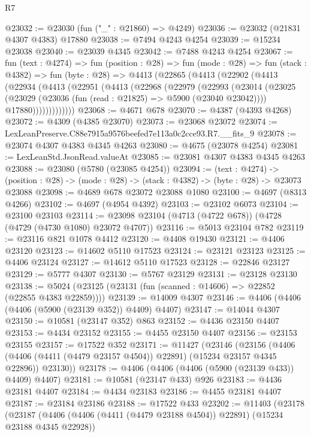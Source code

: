\begin{lexlean}{R7}
\begin{coremodule}
@23032 := @23030 (fun ("_" : @21860) => @4249)
@23036 := @23032 (@21831 @4307 @4383) @17880
@23038 := @7494 @4243 @4254
@23039 := @15234 @23038
@23040 := @23039 @4345
@23042 := @7488 @4243 @4254
@23067 := fun (text : @4274) =>
  fun (position : @28) =>
  fun (mode : @28) =>
  fun (stack : @4382) =>
  fun (byte : @28) =>
  @4413
    (@22865
      (@4413
        (@22902
          (@4413
            (@22934
              (@4413
                (@22951
                  (@4413
                    (@22968
                      (@22979
                        (@22993
                          (@23014
                            (@23025
                              (@23029 (@23036 (fun (read : @21825) => @5900 (@23040 @23042))))
                              @17880)))))))))))))
@23068 := @4671 @678
@23070 := @4387 (@4393 @4268)
@23072 := @4309 (@4385 @23070)
@23073 := @23068 @23072
@23074 := LexLeanPreserve.C88e7915a9576beefed7e113a0c2cce93.R7.__fits_9
@23078 := @23074 @4307 @4383 @4345 @4263
@23080 := @4675 (@23078 @4254)
@23081 := LexLeanStd.JsonRead.valueAt
@23085 := @23081 @4307 @4383 @4345 @4263
@23088 := @23080 (@5780 (@23085 @4254))
@23094 := (text : @4274) ->
  (position : @28) -> (mode : @28) -> (stack : @4382) -> (byte : @28) -> @23073 @23088
@23098 := @4689 @678 @23072 @23088 @1080
@23100 := @4697 (@8313 @4266)
@23102 := @4697 (@4954 @4392)
@23103 := @23102 @6073
@23104 := @23100 @23103
@23114 := @23098 @23104 (@4713 (@4722 @678)) (@4728 (@4729 (@4730 @1080) @23072 @4707))
@23116 := @5013 @23104 @782
@23119 := @23116 @821 @1078 @4412
@23120 := @4408 @19430
@23121 := @4406 @23120
@23123 := @14602 @5110 @17523
@23124 := @23121 @23123
@23125 := @4406 @23124
@23127 := @14612 @5110 @17523
@23128 := @22846 @23127
@23129 := @5777 @4307
@23130 := @5767 @23129
@23131 := @23128 @23130
@23138 := @5024 (@23125 (@23131 (fun (scanned : @14606) => @22852 (@22855 @4383 @22859))))
@23139 := @14009 @4307
@23146 := @4406 (@4406 (@4406 (@5900 (@23139 @352)) @4409) @4407)
@23147 := @14044 @4307
@23150 := @10581 (@23147 @352) @863
@23152 := @4436 @23150 @4407
@23153 := @4434 @23152
@23155 := @4455 @23150 @4407
@23156 := @23153 @23155
@23157 := @17522 @352
@23171 := @11427
    (@23146
      (@23156
        (@4406 (@4406 (@4411 (@4479 @23157 @4504)) @22891) (@15234 @23157 @4345 @22896))
        @23130))
@23178 := @4406 (@4406 (@4406 (@5900 (@23139 @433)) @4409) @4407)
@23181 := @10581 (@23147 @433) @926
@23183 := @4436 @23181 @4407
@23184 := @4434 @23183
@23186 := @4455 @23181 @4407
@23187 := @23184 @23186
@23188 := @17522 @433
@23202 := @11403
    (@23178
      (@23187
        (@4406 (@4406 (@4411 (@4479 @23188 @4504)) @22891) (@15234 @23188 @4345 @22928))

\end{coremodule}
\end{lexlean}

